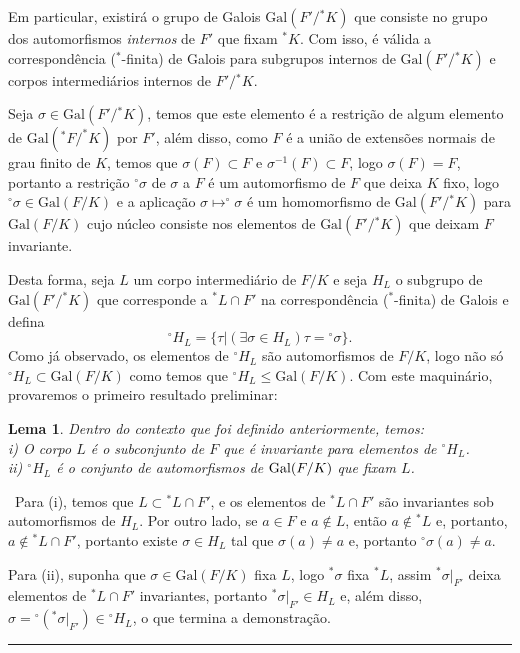 \documentclass[12pt,a4paper]{article}
\newtheorem{lem}[mydef]{Lema}
\def\dem{\par\smallbreak\noindent {\textit{ Demonstração:}} \ }
\def\eop{\hfill\rule{2.5mm}{2.5mm} \\ }
\theoremstyle{definition}
\begin{document}
Em particular, existirá o grupo de Galois $\text{Gal}(F'/{^*K})$ que consiste no grupo dos automorfismos \textit{internos} de $F'$ que fixam ${^*K}$. Com isso, é válida a correspondência ($^*$-finita) de Galois para subgrupos internos de $\text{Gal}(F'/{^*K})$ e corpos intermediários internos de $F'/{^*K}$. 

Seja $\sigma \in \text{Gal}(F'/{^*K})$, temos que este elemento é a restrição de algum elemento de $\text{Gal}(^*F/^*K)$ por $F'$, além disso, como $F$ é a união de extensões normais de grau finito de $K$, temos que $\sigma(F) \subset F$ e $\sigma^{-1}(F)\subset F$, logo $\sigma(F)=F$, portanto a restrição $^\circ \sigma$ de $\sigma$ a $F$ é um automorfismo de $F$ que deixa $K$ fixo, logo $^\circ \sigma\in \text{Gal}(F/K)$ e a aplicação $\sigma \mapsto ^\circ \sigma$ é um homomorfismo de $\text{Gal}(F'/{^*K})$ para $\text{Gal}(F/K)$ cujo núcleo consiste nos elementos de $\text{Gal}(F'/{^*K})$ que deixam $F$ invariante.

Desta forma, seja $L$ um corpo intermediário de $F/K$ e seja $H_L$ o subgrupo de $\text{Gal}(F'/{^*K})$ que corresponde a $^*L\cap F'$ na correspondência ($^*$-finita) de Galois e defina $$^\circ H_L = \{ \tau | (\exists \sigma \in H_L) \tau={^\circ}\sigma \}.$$ Como já observado, os elementos de $^\circ H_L$ são automorfismos de $F/K$, logo não só $^\circ H_L\subset \text{Gal}(F/K)$ como temos que $^\circ H_L\leq \text{Gal}(F/K)$. Com este maquinário, provaremos o primeiro resultado preliminar:

\begin{lem}

    Dentro do contexto que foi definido anteriormente, temos: \\
    
    i) O corpo $L$ é o subconjunto de $F$ que é invariante para elementos de $^\circ H_L$. \\
    
    ii) $^\circ H_L$ é o conjunto de automorfismos de $ \text{\upshape Gal\itshape}(F/K)$ que fixam $L$.

\end{lem}

\dem Para (i), temos que $L\subset {^*L}\cap F'$, e os elementos de $^*L\cap F'$ são invariantes sob automorfismos de $H_L$. Por outro lado, se $a\in F$ e $a\notin L$, então $a\notin {^*L}$ e, portanto, $a\notin {^*L}\cap F'$, portanto existe $\sigma \in H_L$ tal que $\sigma(a)\neq a$ e, portanto $^\circ \sigma (a)\neq a$.

Para (ii), suponha que $\sigma \in \text{Gal}(F/K)$ fixa $L$, logo $^*\sigma$ fixa $^*L$, assim $^*\sigma|_{F'}$ deixa elementos de ${^*L}\cap F'$ invariantes, portanto $^*\sigma|_{F'}\in H_L$ e, além disso, $\sigma={^\circ ({^*\sigma|_{F'}})}\in {^\circ H_L}$, o que termina a demonstração. \eop 
\end{document}
